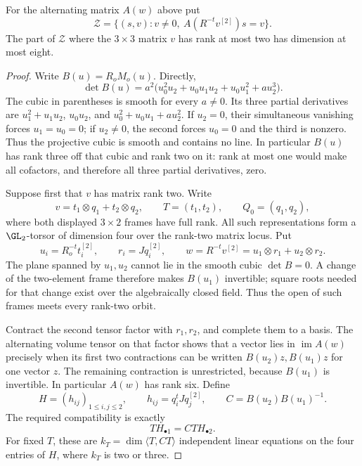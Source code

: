 \begin{lemma}
\label{lem:mixed-degree-one-exceptional-ranks-candidate}
For the alternating matrix $A(w)$ above put
\[
       \mathcal Z=\{(s,v):v\ne0,\ A(R^{-t}v^{[2]})s=v\}.
\]
The part of $\mathcal Z$ where the $3\times3$ matrix $v$ has
rank at most two has dimension at most eight.
\end{lemma}
\begin{proof}
Write $B(u)=R_oM_o(u)$. Directly,
\[
 \det B(u)=a^2\bigl(u_0^2u_2+u_0u_1u_2+u_0u_1^2+a u_2^3\bigr).
\]
The cubic in parentheses is smooth for every $a\ne0$.
Its three partial derivatives are
$u_1^2+u_1u_2$, $u_0u_2$, and
$u_0^2+u_0u_1+a u_2^2$.
If $u_2=0$, their simultaneous vanishing forces $u_1=u_0=0$;
if $u_2\ne0$, the second forces $u_0=0$ and the third is
nonzero. Thus the projective cubic is smooth and contains no
line. In particular $B(u)$ has rank three off that cubic
and rank two on it: rank at most one would make all cofactors,
and therefore all three partial derivatives, zero.

Suppose first that $v$ has matrix rank two. Write
\[
 v=t_1\otimes q_1+t_2\otimes q_2,
 \qquad T=(t_1,t_2),\qquad Q_0=(q_1,q_2),
\]
where both displayed $3\times2$ frames have full rank.
All such representations form a $\GL_2$-torsor of dimension
four over the rank-two matrix locus. Put
\[
 u_i=R_o^{-t}t_i^{[2]},\qquad r_i=Jq_i^{[2]},\qquad
 w=R^{-t}v^{[2]}=u_1\otimes r_1+u_2\otimes r_2.
\]
The plane spanned by $u_1,u_2$ cannot lie in the smooth cubic
$\det B=0$. A change of the two-element frame therefore makes
$B(u_1)$ invertible; square roots needed for that change exist
over the algebraically closed field. Thus the open of such
frames meets every rank-two orbit.

Contract the second tensor factor with $r_1,r_2$, and complete
them to a basis. The alternating volume tensor on that factor
shows that a vector lies in $\operatorname{im}A(w)$ precisely
when its first two contractions can be written
$B(u_2)z,B(u_1)z$ for one vector $z$. The remaining contraction
is unrestricted, because $B(u_1)$ is invertible. In particular
$A(w)$ has rank six. Define
\[
 H=(h_{ij})_{1\le i,j\le2},\qquad
 h_{ij}=q_i^tJq_j^{[2]},\qquad C=B(u_2)B(u_1)^{-1}.
\]
The required compatibility is exactly
\[
                         T H_{\bullet1}=CT H_{\bullet2}.
\]
For fixed $T$, these are $k_T=\dim\langle T,CT\rangle$
independent linear equations on the four entries of $H$,
where $k_T$ is two or three.


\end{proof}
